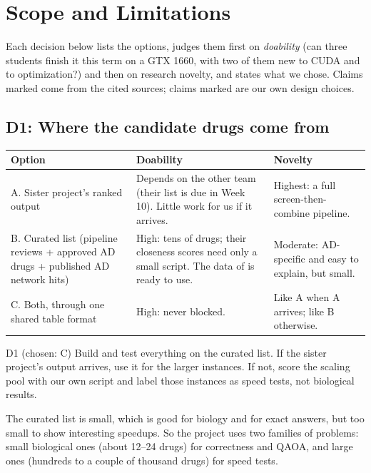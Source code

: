 \section{Scope and Limitations}
\label{sec:decisions}

Each decision below lists the options, judges them first on \emph{doability} (can three students finish it this term on a GTX 1660, with two of them new to CUDA and to optimization?) and then on research novelty, and states what we chose. Claims marked \established{} come from the cited sources; claims marked \proposed{} are our own design choices.

\subsection{D1: Where the candidate drugs come from}

\begin{table}[H]
\centering
\small
\begin{tabularx}{\linewidth}{>{\raggedright\arraybackslash}p{3.0cm}XX}
\toprule
Option & Doability & Novelty \\
\midrule
A. Sister project's ranked output & Depends on the other team (their list is due in Week 10). Little work for us if it arrives. & Highest: a full screen-then-combine pipeline. \\
B. Curated list (pipeline reviews + approved AD drugs + published AD network hits) & High: tens of drugs; their closeness scores need only a small script. The data of \cite{cheng2019combinations} is ready to use. & Moderate: AD-specific and easy to explain, but small. \\
C. Both, through one shared table format & High: never blocked. & Like A when A arrives; like B otherwise. \\
\bottomrule
\end{tabularx}
\end{table}

\begin{decision}{D1 (chosen: C)}
Build and test everything on the curated list. If the sister project's output arrives, use it for the larger instances. If not, score the scaling pool with our own script and label those instances as speed tests, not biological results.
\end{decision}


The curated list is small, which is good for biology and for exact answers, but too small to show interesting speedups. So the project uses two families of problems: small biological ones (about 12--24 drugs) for correctness and QAOA, and large ones (hundreds to a couple of thousand drugs) for speed tests.



